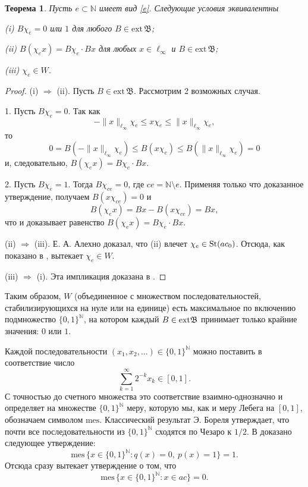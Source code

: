 \documentclass[12pt]{article}
\newtheorem{thm}{Теорема}
\def\N{{\mathbb{N}}}
\def\B{{\mathfrak{B}}}
\def\ext{{\mathrm{ext}\,}}
\def\mes{{\mathrm{mes}}}
\begin{document}


\begin{thm}\label{thm1}
Пусть $e\subset \N$ имеет вид \eqref{e}. Следующие условия эквивалентны

(i) $B\chi_e=0$ или $1$ для любого $B\in \ext\B$;

(ii) $B(\chi_e x)= B\chi_e \cdot Bx$ для любых $x\in \ell_\infty$ и $B\in \ext\B$;

(iii) $\chi_e\in W$.
\end{thm}

\begin{proof}
(i) $\Longrightarrow$ (ii). Пусть $B\in \ext\B$. Рассмотрим 2 возможных случая.

1. Пусть $B\chi_e=0$. Так как
$$-\|x\|_{\ell_\infty}\chi_e \le x \chi_e \le \|x\|_{\ell_\infty}\chi_e,$$
то
$$0=B(-\|x\|_{\ell_\infty}\chi_e) \le B(x \chi_e) \le B(\|x\|_{\ell_\infty}\chi_e)=0$$
и, следовательно, $B(\chi_e x)= B\chi_e \cdot Bx$.

2. Пусть $B\chi_e=1$. Тогда $B\chi_{ce}=0$, где $ce=\N\setminus e$. Применяя только что доказанное утверждение, получаем $B(x\chi_{ce})=0$ и
$$B(\chi_e x)= Bx - B(x\chi_{ce})= Bx,$$
что и доказывает равенство $B(\chi_e x)= B\chi_e \cdot Bx$.


(ii) $\Longrightarrow$ (iii). Е. А. Алехно \cite[Утверждение 2.3]{Alekhno} доказал, что (ii) влечет $\chi_e \in {\rm St}(ac_0)$. Отсюда, как показано в  \cite[Лемма 35]{SSU2}, вытекает $\chi_e\in W$.

(iii) $\Longrightarrow$ (i). Эта импликация доказана в \cite[Следствие 29]{SSU2}.
\end{proof}

Таким образом, $W$ (объединенное с множеством последовательностей, стабилизирующихся на нуле или на единице) есть максимальное по включению подмножество $\{0,1\}^\N$, на котором каждый $B\in {\rm ext}\mathfrak B$ принимает только крайние значения: $0$ или $1$.

Каждой последовательности $(x_1, x_2, \dots)\in \{0,1\}^\N$ можно поставить в соответствие число
\begin{equation}\label{eq:bijection_omega_0_1}
	\sum_{k=1}^\infty 2^{-k} x_k \in [0,1]
	.
\end{equation}
С точностью до счетного множества это соответствие взаимно-однозначно и определяет на множестве $\{0,1\}^\N$ меру, которую мы, как и меру Лебега на $[0,1]$, обозначаем символом $\mes$. Классический результат Э. Бореля утверждает, что почти все последовательности из $\{0,1\}^\N$ сходятся по Чезаро к $1/2$. В \cite{SS} доказано следующее утверждение:
$$ \mes \, \{x\in \{0,1\}^\N: q(x)=0, \ p(x)=1\}=1.$$ Отсюда сразу вытекает утверждение \cite{Connor} о том, что
\begin{equation}\label{ac_meas}
\mes \, \{x\in \{0,1\}^\N: x\in ac\}=0.
\end{equation}
\end{document}

